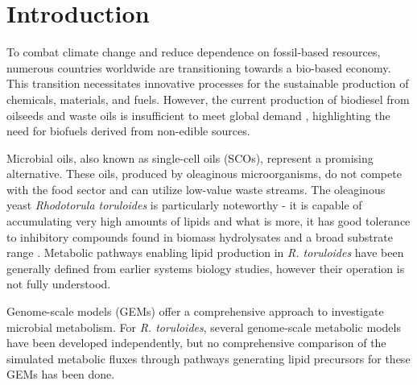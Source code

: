 \chapter*{Introduction}
{}



To combat climate change and reduce dependence on fossil-based resources, numerous countries worldwide are transitioning towards a bio-based economy. This transition necessitates innovative processes for the sustainable production of chemicals, materials, and fuels. However, the current production of biodiesel from oilseeds and waste oils is insufficient to meet global demand \cite{Koutinas2014}, highlighting the need for biofuels derived from non-edible sources. 

Microbial oils, also known as single-cell oils (SCOs), represent a promising alternative. These oils, produced by oleaginous microorganisms, do not compete with the food sector and can utilize low-value waste streams. The oleaginous yeast \textit{Rhodotorula toruloides} is particularly noteworthy - it is capable of accumulating very high amounts of lipids and what is more, it has good tolerance to inhibitory compounds found in biomass hydrolysates and a broad substrate range \cite{Bonturi2017}. 
Metabolic pathways enabling lipid production in \textit{R. toruloides} have been generally defined from earlier systems biology studies, however their operation is not fully understood.

Genome-scale models (GEMs) offer a comprehensive approach to investigate microbial metabolism. For \textit{R. toruloides}, several genome-scale metabolic models have been developed independently, but no comprehensive comparison of the simulated metabolic fluxes through pathways generating lipid precursors for these GEMs has been done. 

